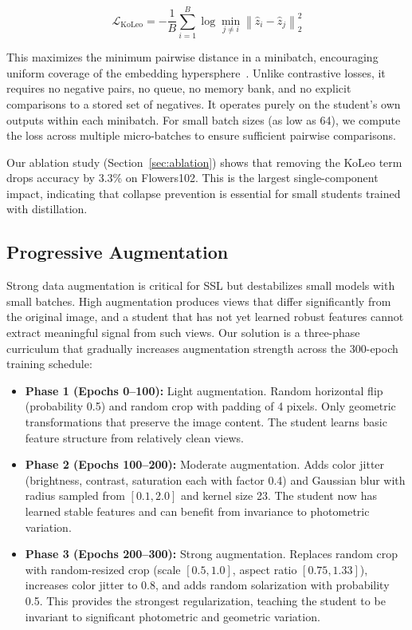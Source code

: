 \documentclass{article}
\begin{document}
\begin{equation}
    \mathcal{L}_{\text{KoLeo}} = -\frac{1}{B} \sum_{i=1}^{B} \log \min_{j \neq i} \left\| \hat{z}_i - \hat{z}_j \right\|_2^2
\end{equation}

This maximizes the minimum pairwise distance in a minibatch, encouraging uniform coverage of the embedding hypersphere~\cite{koleo}. Unlike contrastive losses, it requires no negative pairs, no queue, no memory bank, and no explicit comparisons to a stored set of negatives. It operates purely on the student's own outputs within each minibatch. For small batch sizes (as low as 64), we compute the loss across multiple micro-batches to ensure sufficient pairwise comparisons.

Our ablation study (Section~\ref{sec:ablation}) shows that removing the KoLeo term drops accuracy by 3.3\% on Flowers102. This is the largest single-component impact, indicating that collapse prevention is essential for small students trained with distillation.

\subsection{Progressive Augmentation}

Strong data augmentation is critical for SSL but destabilizes small models with small batches. High augmentation produces views that differ significantly from the original image, and a student that has not yet learned robust features cannot extract meaningful signal from such views. Our solution is a three-phase curriculum that gradually increases augmentation strength across the 300-epoch training schedule:

\begin{itemize}
    \item \textbf{Phase 1 (Epochs 0--100):} Light augmentation. Random horizontal flip (probability 0.5) and random crop with padding of 4 pixels. Only geometric transformations that preserve the image content. The student learns basic feature structure from relatively clean views.
    \item \textbf{Phase 2 (Epochs 100--200):} Moderate augmentation. Adds color jitter (brightness, contrast, saturation each with factor 0.4) and Gaussian blur with radius sampled from $[0.1, 2.0]$ and kernel size 23. The student now has learned stable features and can benefit from invariance to photometric variation.
    \item \textbf{Phase 3 (Epochs 200--300):} Strong augmentation. Replaces random crop with random-resized crop (scale $[0.5, 1.0]$, aspect ratio $[0.75, 1.33]$), increases color jitter to 0.8, and adds random solarization with probability 0.5. This provides the strongest regularization, teaching the student to be invariant to significant photometric and geometric variation.
\end{itemize}
\end{document}
